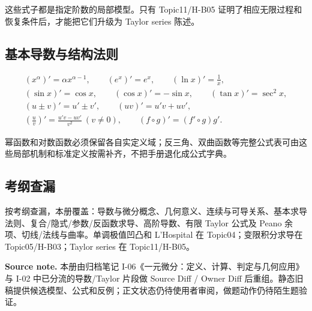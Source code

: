 \documentclass[11pt,a4paper]{ctexart}
\begin{document}
这些式子都是指定阶数的局部模型。只有 Topic11/H-B05 证明了相应无限过程和恢复条件后，才能把它们升级为 Taylor series 陈述。

\subsection{基本导数与结构法则}

\[
\begin{gathered}
(x^\alpha)'=\alpha x^{\alpha-1},\qquad
(e^x)'=e^x,\qquad
(\ln x)'=\frac1x,\\
(\sin x)'=\cos x,\qquad
(\cos x)'=-\sin x,\qquad
(\tan x)'=\sec^2x,\\
(u\pm v)'=u'\pm v',\qquad
(uv)'=u'v+uv',\\
\left(\frac uv\right)'=\frac{u'v-uv'}{v^2}\ (v\ne0),\qquad
(f\circ g)'=(f'\circ g)g'.
\end{gathered}
\]

幂函数和对数函数必须保留各自实定义域；反三角、双曲函数等完整公式表可由这些局部机制和标准定义按需补齐，不把手册退化成公式字典。

\subsection{考纲查漏}

按考纲查漏，本册覆盖：导数与微分概念、几何意义、连续与可导关系、基本求导法则、复合/隐式/参数/反函数求导、高阶导数、有限 Taylor 公式及 Peano 余项、切线/法线与曲率。单调极值凹凸和 L'Hospital 在 Topic04；变限积分求导在 Topic05/H-B03；Taylor series 在 Topic11/H-B05。

\noindent\textbf{Source note.} 本册由归档笔记 I-06《一元微分：定义、计算、判定与几何应用》与 I-02 中已分流的导数/Taylor 片段做 Source Diff / Owner Diff 后重组。静态旧稿提供候选模型、公式和反例；正文状态仍待使用者审阅，做题动作仍待陌生题验证。
\end{document}
